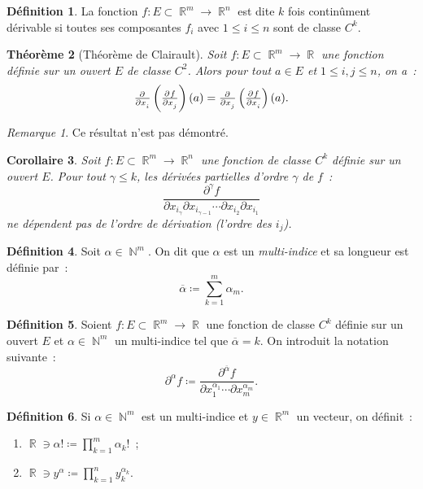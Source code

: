 \documentclass{article}
\DeclareMathOperator{\N}{\mathbb N}
\DeclareMathOperator{\R}{\mathbb R}
\newtheorem{thm}{Théorème}[section]
\newtheorem{cor}[thm]{Corollaire}
\theoremstyle{definition}
\newtheorem{déf}[thm]{Définition}
\theoremstyle{remark}
\newtheorem*{rmq}{Remarque}
\begin{document}
		\begin{déf} La fonction $f : E \subset \R^m \to \R^n$ est dite $k$ fois continûment dérivable si toutes ses composantes $f_i$ avec $1 \leq i \leq n$
		sont de classe $C^k$.
		\end{déf}

		\begin{thm}[Théorème de Clairault] Soit $f : E \subset \R^m \to \R$ une fonction définie sur un ouvert $E$ de classe $C^2$. Alors pour tout $a \in E$
		et $1 \leq i, j \leq n$, on a~:
		\[\pd {}{x_i}\left(\pd f{x_j}\right)(a) = \pd {}{x_j}\left(\pd f{x_i}\right)(a).\]
		\end{thm}

		\begin{rmq} Ce résultat n'est pas démontré. \end{rmq}

		\begin{cor} Soit $f : E \subset \R^m \to \R^n$ une fonction de classe $C^k$ définie sur un ouvert $E$. Pour tout $\gamma \leq k$, les dérivées partielles
		d'ordre $\gamma$ de $f$~:
		\[\frac {\partial^\gamma f}{\partial x_{i_\gamma}\partial x_{i_{\gamma-1}}\dotsb\partial x_{i_2}\partial x_{i_1}}\]
		ne dépendent pas de l'ordre de dérivation (l'ordre des $i_j$).
		\end{cor}

		\begin{déf} Soit $\alpha \in \N^m$. On dit que $\alpha$ est un \emph{multi-indice} et sa longueur est définie par~:
		\[\overline \alpha \coloneqq \sum_{k=1}^m\alpha_m.\]
		\end{déf}

		\begin{déf} Soient $f : E \subset \R^m \to \R$ une fonction de classe $C^k$ définie sur un ouvert $E$ et $\alpha \in \N^m$ un multi-indice tel que
		$\overline \alpha = k$. On introduit la notation suivante~:
		\[\partial^\alpha f \coloneqq \frac {\partial^{\overline \alpha}f}{\partial x_1^{\alpha_1}\dotsb\partial x_m^{\alpha_m}}.\]
		\end{déf}

		\begin{déf} Si $\alpha \in \N^m$ est un multi-indice et $y \in \R^m$ un vecteur, on définit~:
		\begin{enumerate}
			\item $\R \ni \alpha ! \coloneqq \prod_{k=1}^m\alpha_k!$~;
			\item $\R \ni y^\alpha \coloneqq \prod_{k=1}^ny_k^{\alpha_k}$.
		\end{enumerate}
		\end{déf}
\end{document}
